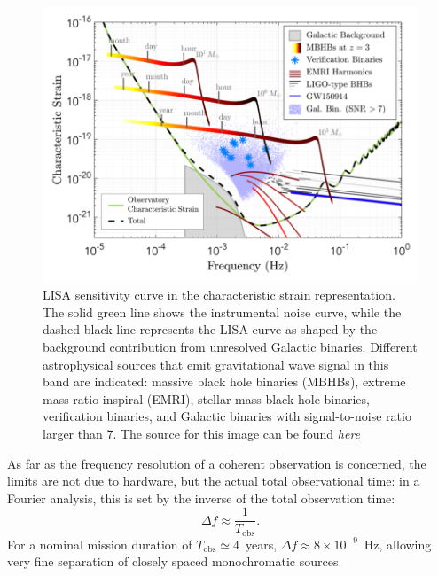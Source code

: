 \begin{figure}
    \begin{center}
        \includegraphics[width=\textwidth]{images/lisa_sensitivity_with_noises.png}
    \end{center}
    \caption{LISA sensitivity curve in the characteristic strain representation.
    The solid green line shows the instrumental noise curve, while the dashed black line represents the LISA curve as shaped by the background contribution from unresolved Galactic binaries.
    Different astrophysical sources that emit gravitational wave signal in this band are indicated: massive black hole binaries (MBHBs), extreme mass-ratio inspiral (EMRI), stellar-mass black hole binaries, verification binaries, and Galactic binaries with signal-to-noise ratio larger than 7.
The source for this image can be found \underline{\textit{\href{https://ar5iv.labs.arxiv.org/html/1803.01944}{here}}}}\label{fig: LISA sens curve with noises}
\end{figure}
As far as the frequency resolution of a coherent observation is concerned, the limits are not due to hardware, but the actual total observational time: in a Fourier analysis, this is set by the inverse of the total observation time:  
\begin{equation}
\Delta f \approx \frac{1}{T_{\mathrm{obs}}}.
\end{equation}
For a nominal mission duration of $T_{\mathrm{obs}} \simeq 4$~years, $\Delta f \approx 8\times 10^{-9}$~Hz, allowing very fine separation of closely spaced monochromatic sources.

